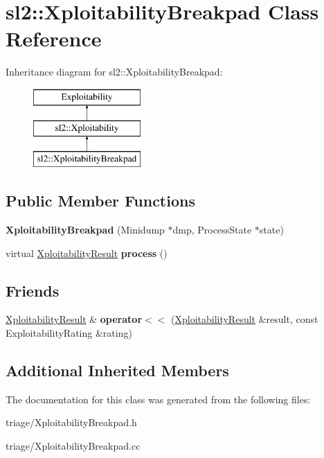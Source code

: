 \hypertarget{classsl2_1_1_xploitability_breakpad}{}\section{sl2\+:\+:Xploitability\+Breakpad Class Reference}
\label{classsl2_1_1_xploitability_breakpad}
Inheritance diagram for sl2\+:\+:Xploitability\+Breakpad\+:\begin{figure}[H]
\begin{center}
\leavevmode
\includegraphics[height=3.000000cm]{dd/d0c/classsl2_1_1_xploitability_breakpad}
\end{center}
\end{figure}
\subsection*{Public Member Functions}
\begin{DoxyCompactItemize}
\item 
\mbox{\label{classsl2_1_1_xploitability_breakpad_ad0005ab11a69f1cb5e63b157f3383b71}} 
{\bfseries Xploitability\+Breakpad} (Minidump $\ast$dmp, Process\+State $\ast$state)
\item 
\mbox{\label{classsl2_1_1_xploitability_breakpad_afae129de9b1a615292a3142daf7ea0aa}} 
virtual \mbox{\hyperlink{classsl2_1_1_xploitability_result}{Xploitability\+Result}} {\bfseries process} ()
\end{DoxyCompactItemize}
\subsection*{Friends}
\begin{DoxyCompactItemize}
\item 
\mbox{\label{classsl2_1_1_xploitability_breakpad_a24303aafd50e1c07856afcb00bf1ebfa}} 
\mbox{\hyperlink{classsl2_1_1_xploitability_result}{Xploitability\+Result}} \& {\bfseries operator$<$$<$} (\mbox{\hyperlink{classsl2_1_1_xploitability_result}{Xploitability\+Result}} \&result, const Exploitability\+Rating \&rating)
\end{DoxyCompactItemize}
\subsection*{Additional Inherited Members}


The documentation for this class was generated from the following files\+:\begin{DoxyCompactItemize}
\item 
triage/Xploitability\+Breakpad.\+h\item 
triage/Xploitability\+Breakpad.\+cc\end{DoxyCompactItemize}
